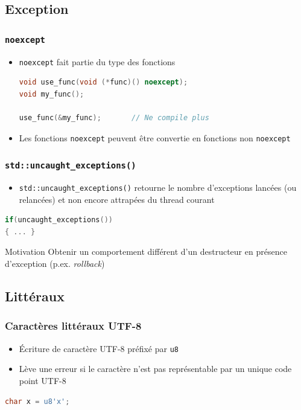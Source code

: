 \documentclass[C++.tex]{subfiles}
\begin{document}
\subsection*{Exception}
\begin{frame}[fragile]
	\frametitle{\lstinline|noexcept|}
	\begin{itemize}
		\item \lstinline|noexcept| fait partie du type des fonctions

		\begin{lstlisting}[language=C++]
void use_func(void (*func)() noexcept);
void my_func();

use_func(&my_func);       // Ne compile plus\end{lstlisting}


		\item Les fonctions \lstinline|noexcept| peuvent être convertie en fonctions non \lstinline|noexcept|
	\end{itemize}	
\end{frame}

\begin{frame}[fragile]
	\frametitle{\lstinline|std::uncaught_exceptions()|}
	\begin{itemize}
		\item \lstinline|std::uncaught_exceptions()| retourne le nombre d'exceptions lancées (ou relancées) et non encore attrapées du thread courant
	\end{itemize}

	\begin{lstlisting}[language=C++]
if(uncaught_exceptions())
{ ... }\end{lstlisting}

	\begin{block}{Motivation}
		Obtenir un comportement différent d'un destructeur en présence d'exception (p.ex. \textit{rollback})
	\end{block}
\end{frame}

\subsection*{Littéraux}
\begin{frame}[fragile]
	\frametitle{Caractères littéraux UTF-8}
	\begin{itemize}
		\item Écriture de caractère UTF-8 préfixé par \lstinline|u8|
		\item Lève une erreur si le caractère n'est pas représentable par un unique code point UTF-8
	\end{itemize}

	\begin{lstlisting}[language=C++]
char x = u8'x';\end{lstlisting}

\end{frame}
\end{document}
